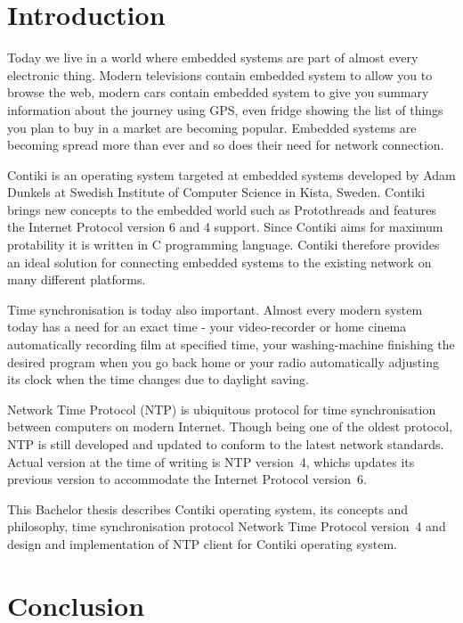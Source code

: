 
\chapter{Introduction}
Today we live in a world where embedded systems are part of almost every electronic thing. Modern televisions
contain embedded system to allow you to browse the web, modern cars contain embedded system to give you summary information
about the journey using GPS, even fridge showing the list of things you plan to buy in a market are becoming popular.
Embedded systems are becoming spread more than ever and so does
their need for network connection.

Contiki is an operating system targeted at embedded systems
developed by Adam Dunkels at Swedish Institute of Computer Science in Kista, Sweden.
Contiki brings new concepts to the embedded world such as Protothreads and features
the Internet Protocol version 6 and 4 support.
Since Contiki aims for maximum protability it is written in C programming language.
Contiki therefore provides an ideal solution for connecting
embedded systems to the existing network on many different platforms.

Time synchronisation is today also important.
Almost every modern system today has a need for an exact time -
your video-recorder or home cinema automatically recording film at specified time, your washing-machine finishing the
desired program when you go back home or your radio automatically adjusting its clock when the time changes
due to daylight saving.

Network Time Protocol (NTP) is ubiquitous protocol for time synchronisation between computers on modern Internet.
Though being one of the oldest protocol, NTP is still developed and updated to conform to the latest
network standards. Actual version at the time of writing is NTP version~4, whichs updates its previous version to
accommodate the Internet Protocol version~6.

This Bachelor thesis describes Contiki operating system, its concepts and philosophy, time synchronisation protocol
Network Time Protocol version~4 and design and implementation of NTP client for Contiki operating system.








\chapter{Conclusion}
